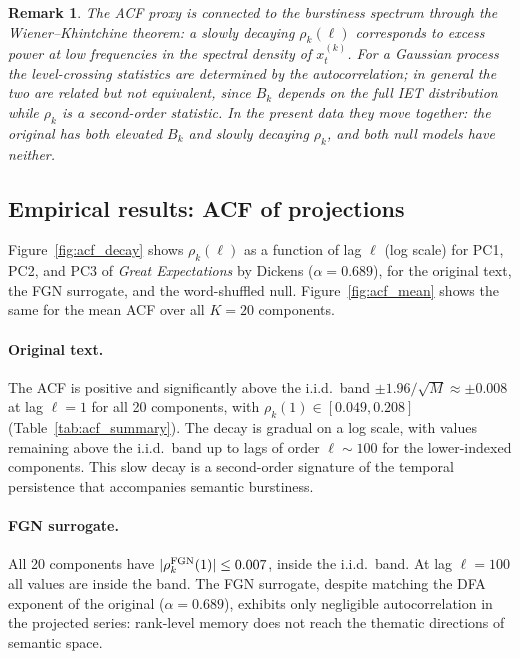 \documentclass[preprint]{elsarticle}
\newtheorem{remark}{Remark}
\newcommand{\bk}{B_k}
\begin{document}
\begin{remark}
  The ACF proxy is connected to the burstiness spectrum through the
  Wiener--Khintchine theorem: a slowly decaying $\rho_k(\ell)$
  corresponds to excess power at low frequencies in the spectral
  density of $x_t^{(k)}$. For a Gaussian process the level-crossing
  statistics are determined by the autocorrelation; in general the two
  are related but not equivalent, since $\bk$ depends on the full IET
  distribution while $\rho_k$ is a second-order statistic. In the
  present data they move together: the original has both elevated
  $\bk$ and slowly decaying $\rho_k$, and both null models have
  neither.
\end{remark}


\subsection{Empirical results: ACF of projections}
\label{sec:acf_results}

Figure~\ref{fig:acf_decay} shows $\rho_k(\ell)$ as a function of lag
$\ell$ (log scale) for PC1, PC2, and PC3 of
\emph{Great Expectations} by Dickens ($\alpha = 0.689$), for the original text, the FGN surrogate, and
the word-shuffled null.
Figure~\ref{fig:acf_mean} shows the same for the mean ACF over all
$K = 20$ components.

\paragraph{Original text.}
The ACF is positive and significantly above the i.i.d.\ band
$\pm 1.96/\sqrt{M} \approx \pm 0.008$ at lag $\ell = 1$ for all 20
components, with $\rho_k(1) \in [0.049, 0.208]$
(Table~\ref{tab:acf_summary}).
The decay is gradual on a log scale, with values remaining above the
i.i.d.\ band up to lags of order $\ell \sim 100$ for the
lower-indexed components.
This slow decay is a second-order signature of the temporal
persistence that accompanies semantic burstiness.

\paragraph{FGN surrogate.}
All 20 components have $|\rho_k^{\rm FGN}(1)| \le 0.007$, inside the
i.i.d.\ band.
At lag $\ell = 100$ all values are inside the band.
The FGN surrogate, despite matching the DFA exponent of the original
($\alpha = 0.689$), exhibits only negligible autocorrelation in the
projected series: rank-level memory does not reach the thematic
directions of semantic space.
\end{document}
